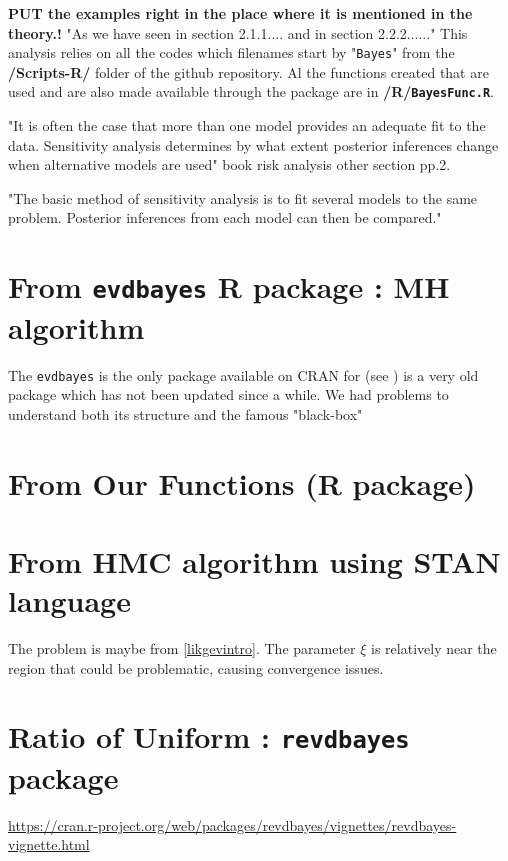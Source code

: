 
\textbf{PUT the examples right in the place where it is mentioned in the theory.!} 
"As we have seen in section 2.1.1.... and in section 2.2.2......"
This analysis relies on all the codes which filenames start by "\texttt{Bayes}" from the \textbf{/Scripts-R/} folder of the github repository. Al the functions created that are used and are also made available through the package are in \textbf{/R/\texttt{BayesFunc.R}}.


"It is often the case that more than one model provides an adequate fit to the data. Sensitivity analysis determines by what extent posterior inferences change when alternative
models are used"   book risk analysis other section pp.2.

"The basic method of sensitivity analysis is to fit several models to
the same problem. Posterior inferences from each model can then be compared."


\section{From \texttt{evdbayes} R package : MH algorithm}

The \texttt{evdbayes} is the only package available on CRAN for (see \citet{ribatet_users_2006}) is a very old package which has not been updated since a while. We had problems to understand both its structure and the famous "black-box"


\section{From Our Functions (R package)}



\section{From HMC algorithm using STAN language}

The problem is maybe from \ref{likgevintro}. The parameter $\xi$ is relatively near the region that could be problematic, causing convergence issues. 



\section{Ratio of Uniform : \texttt{revdbayes} package}

\url{https://cran.r-project.org/web/packages/revdbayes/vignettes/revdbayes-vignette.html}



